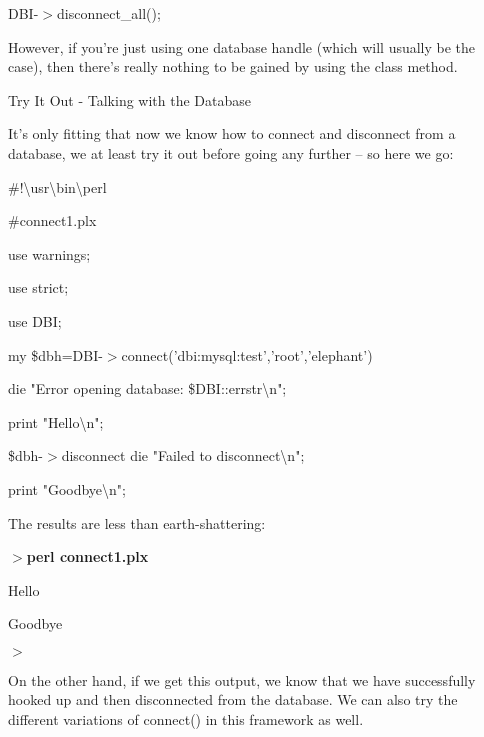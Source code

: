 \documentclass[a4paper,11pt]{book}
\begin{document}
\noindent 

\noindent DBI-$>$disconnect\_all();

\noindent 

\noindent However, if you're just using one database handle (which will usually be the case), then there's really nothing to be gained by using the class method.

\noindent 

\noindent Try It Out - Talking with the Database

\noindent It's only fitting that now we know how to connect and disconnect from a database, we at least try it out before going any further -- so here we go:

\noindent 

\noindent \#!\textbackslash usr\textbackslash bin\textbackslash perl

\noindent \#connect1.plx

\noindent 

\noindent use warnings;

\noindent use strict;

\noindent use DBI;

\noindent 

\noindent my \$dbh=DBI-$>$connect('dbi:mysql:test','root','elephant') \textbar \textbar 

\noindent die "Error opening database: \$DBI::errstr\textbackslash n";

\noindent print "Hello\textbackslash n";

\noindent \$dbh-$>$disconnect \textbar \textbar  die "Failed to disconnect\textbackslash n";

\noindent print "Goodbye\textbackslash n";

\noindent 

\noindent 

\noindent The results are less than earth-shattering:

\noindent 

\noindent $>$\textbf{perl connect1.plx}

\noindent Hello

\noindent Goodbye

\noindent $>$

\noindent 

\noindent On the other hand, if we get this output, we know that we have successfully hooked up and then disconnected from the database. We can also try the different variations of connect() in this framework as well.
\end{document}

